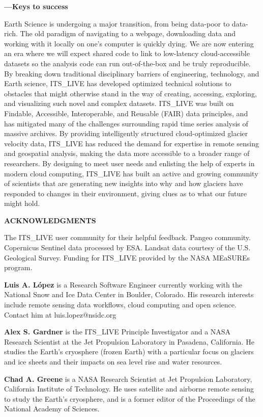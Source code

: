 \documentclass[
  super,
  preprint,
  3p,
  twocolumn]{elsarticle}
\begin{document}
\newpage{}

\textbf{---Keys to success}

Earth Science is undergoing a major transition, from being data-poor to
data-rich. The old paradigm of navigating to a webpage, downloading data
and working with it locally on one's computer is quickly dying. We are
now entering an era where we will expect shared code to link to
low-latency cloud-accessible datasets so the analysis code can run
out-of-the-box and be truly reproducible. By breaking down traditional
disciplinary barriers of engineering, technology, and Earth science,
ITS\_LIVE has developed optimized technical solutions to obstacles that
might otherwise stand in the way of creating, accessing, exploring, and
visualizing such novel and complex datasets. ITS\_LIVE was built on
Findable, Accessible, Interoperable, and Reusable (FAIR) data
principles, and has mitigated many of the challenges surrounding rapid
time series analysis of massive archives. By providing intelligently
structured cloud-optimized glacier velocity data, ITS\_LIVE has reduced
the demand for expertise in remote sensing and geospatial analysis,
making the data more accessible to a broader range of researchers. By
designing to meet user needs and enlisting the help of experts in modern
cloud computing, ITS\_LIVE has built an active and growing community of
scientists that are generating new insights into why and how glaciers
have responded to changes in their environment, giving clues as to what
our future might hold.

\textbf{ACKNOWLEDGMENTS}

The ITS\_LIVE user community for their helpful feedback. Pangeo
community. Copernicus Sentinel data processed by ESA. Landsat data
courtesy of the U.S. Geological Survey. Funding for ITS\_LIVE provided
by the NASA MEaSUREs program.

\textbf{Luis A. López} is a Research Software Engineer currently working
with the National Snow and Ice Data Center in Boulder, Colorado. His
research interests include remote sensing data workflows, cloud
computing and open science. Contact him at luis.lopez@nsidc.org

\textbf{Alex S. Gardner} is the ITS\_LIVE Principle Investigator and a
NASA Research Scientist at the Jet Propulsion Laboratory in Pasadena,
California. He studies the Earth's cryosphere (frozen Earth) with a
particular focus on glaciers and ice sheets and their impacts on sea
level rise and water resources.

\textbf{Chad A. Greene} is a NASA Research Scientist at Jet Propulsion
Laboratory, California Institute of Technology. He uses satellite and
airborne remote sensing to study the Earth's cryosphere, and is a former
editor of the Proceedings of the National Academy of Sciences.
\end{document}
